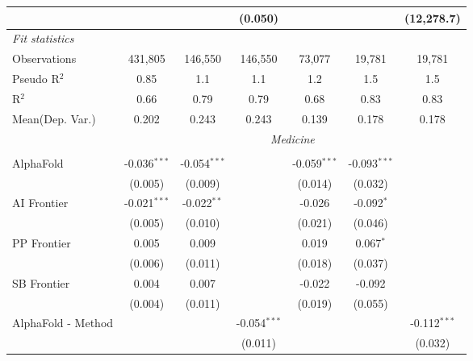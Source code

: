 \begin{tabular}{lcccccc}
                                 &                &                & (0.050)        &                &              & (12,278.7)\\   
   \midrule
   \emph{Fit statistics}\\
   Observations                  & 431,805        & 146,550        & 146,550        & 73,077         & 19,781       & 19,781\\  
   Pseudo R$^2$                  & 0.85           & 1.1            & 1.1            & 1.2            & 1.5          & 1.5\\  
   R$^2$                         & 0.66           & 0.79           & 0.79           & 0.68           & 0.83         & 0.83\\  
   
Mean(Dep. Var.) & 0.202 & 0.243 & 0.243 & 0.139 & 0.178 & 0.178 \\
 & \multicolumn{6}{c}{\textit{Medicine}} \\ \\
   AlphaFold                     & -0.036$^{***}$ & -0.054$^{***}$ &                & -0.059$^{***}$ & -0.093$^{***}$ &   \\   
                                 & (0.005)        & (0.009)        &                & (0.014)        & (0.032)        &   \\   
   AI Frontier                   & -0.021$^{***}$ & -0.022$^{**}$  &                & -0.026         & -0.092$^{*}$   &   \\   
                                 & (0.005)        & (0.010)        &                & (0.021)        & (0.046)        &   \\   
   PP Frontier                   & 0.005          & 0.009          &                & 0.019          & 0.067$^{*}$    &   \\   
                                 & (0.006)        & (0.011)        &                & (0.018)        & (0.037)        &   \\   
   SB Frontier                   & 0.004          & 0.007          &                & -0.022         & -0.092         &   \\   
                                 & (0.004)        & (0.011)        &                & (0.019)        & (0.055)        &   \\   
   AlphaFold - Method            &                &                & -0.054$^{***}$ &                &                & -0.112$^{***}$\\   
                                 &                &                & (0.011)        &                &                & (0.032)\\   

\end{tabular}
